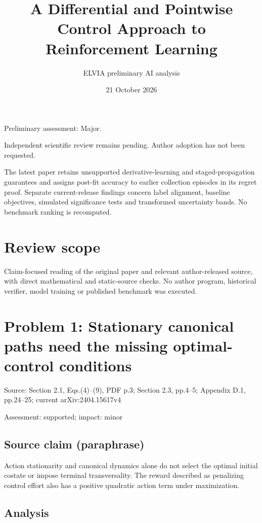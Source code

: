 \documentclass[11pt]{article}
\begin{document}
\title{A Differential and Pointwise Control Approach to Reinforcement Learning}

\author{ELVIA preliminary AI analysis}\date{21 October 2026}\maketitle

Preliminary assessment: Major.\par

Independent scientific review remains pending. Author adoption has not been requested.

The latest paper retains unsupported derivative-learning and staged-propagation guarantees and assigns post-fit accuracy to earlier collection episodes in its regret proof. Separate current-release findings concern label alignment, baseline objectives, simulated significance tests and transformed uncertainty bands. No benchmark ranking is recomputed.

\section*{Review scope}

Claim-focused reading of the original paper and relevant author-released source, with direct mathematical and static-source checks. No author program, historical verifier, model training or published benchmark was executed.

\section*{Problem 1: Stationary canonical paths need the missing optimal-control conditions}

Source: Section 2.1, Eqs.(4)–(9), PDF p.3; Section 2.3, pp.4–5; Appendix D.1, pp.24–25; current arXiv:2404.15617v4

Assessment: supported; impact: minor

\subsection*{Source claim (paraphrase)}

Action stationarity and canonical dynamics alone do not select the optimal initial costate or impose terminal transversality. The reward described as penalizing control effort also has a positive quadratic action term under maximization.

\subsection*{Analysis}
\end{document}
